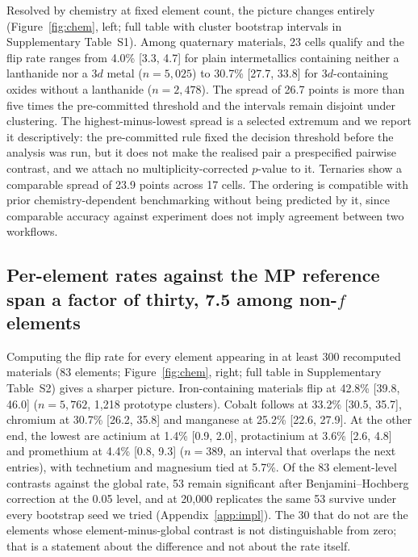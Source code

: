 \documentclass[11pt]{article}
\begin{document}
Resolved by chemistry at fixed element count, the picture changes entirely
(Figure~\ref{fig:chem}, left; full table with cluster bootstrap intervals in
Supplementary Table~S1). Among quaternary materials, 23 cells qualify and the flip rate
ranges from 4.0\% [3.3, 4.7] for plain intermetallics containing neither a lanthanide nor
a 3$d$ metal ($n=5{,}025$) to 30.7\% [27.7, 33.8] for 3$d$-containing oxides without a
lanthanide ($n=2{,}478$). The spread of 26.7 points is more than five times the
pre-committed threshold and the intervals remain disjoint under clustering. The
highest-minus-lowest spread is a selected extremum and we report it descriptively: the
pre-committed rule fixed the decision threshold before the analysis was run, but it does
not make the realised pair a prespecified pairwise contrast, and we attach no
multiplicity-corrected $p$-value to it. Ternaries show a comparable spread of 23.9 points
across 17 cells. The ordering is compatible with prior chemistry-dependent benchmarking
\citep{kothakonda2023} without being predicted by it, since comparable accuracy against
experiment does not imply agreement between two workflows.


\subsection{Per-element rates against the MP reference span a factor of thirty, 7.5 among non-\texorpdfstring{$f$}{f} elements}\label{sec:element}

Computing the flip rate for every element appearing in at least 300 recomputed materials
(83 elements; Figure~\ref{fig:chem}, right; full table in Supplementary Table~S2) gives a
sharper picture. Iron-containing materials flip at 42.8\% [39.8, 46.0] ($n=5{,}762$,
1{,}218 prototype clusters). Cobalt follows at 33.2\% [30.5, 35.7], chromium at 30.7\%
[26.2, 35.8] and manganese at 25.2\% [22.6, 27.9]. At the other end, the lowest are
actinium at 1.4\% [0.9, 2.0], protactinium at 3.6\% [2.6, 4.8] and promethium at 4.4\% [0.8, 9.3]
($n=389$, an interval that overlaps the next entries), with technetium and magnesium tied at 5.7\%. Of the 83 element-level contrasts
against the global rate, 53 remain significant after Benjamini--Hochberg correction at
the 0.05 level, and at 20{,}000 replicates the same 53 survive under every bootstrap seed
we tried (Appendix~\ref{app:impl}). The 30 that do not are the elements whose
element-minus-global contrast is not distinguishable
from zero; that is a statement about the difference and not about the rate itself.
\end{document}
